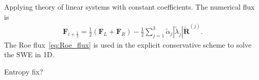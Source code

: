 Applying theory of linear systems with constant coefficients.
The numerical flux is
\begin{align}\label{eq:Roe_flux}
    \mathbf{F}_{i+\frac{1}{2}} = \frac{1}{2} \left( \mathbf{F}_L + \mathbf{F}_R \right) - \frac{1}{2} \sum_{j=1}^3 \tilde{\alpha}_j \left| \tilde{\lambda}_j \right| \tilde{\mathbf{R}}^{(j)}.
\end{align}
The Roe flux~\eqref{eq:Roe_flux} is used in the explicit conservative scheme to solve the SWE in 1D.

Entropy fix?








